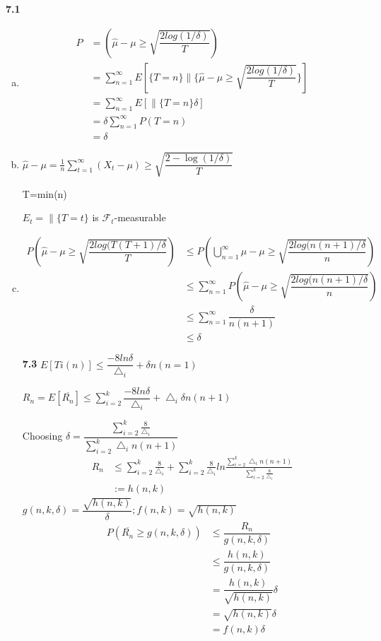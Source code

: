 



\noindent\textbf{7.1}

    \begin{enumerate}[(a)]
    \item
    \begin{align*}
    P &=(\hat{\mu}-\mu\ge\sqrt{\dfrac{2log(1/\delta)}{T}})\\
    &=\sum^{\infty}_{n=1}E[\{T=n\}\|\{\hat{\mu}-\mu\ge\sqrt{\dfrac{2log(1/\delta)}{T}}\}]\\
    &=\sum^{\infty}_{n=1}E[\|\{T=n\}\delta]\\
    &=\delta\sum^{\infty}_{n=1}P(T=n)\\
    &=\delta
    \end{align*}

    \item
    $\hat{\mu}-\mu=\frac{1}{n}\sum^{\infty}_{t=1}(X_t-\mu)\ge\sqrt{\dfrac{2-\log(1/\delta)}{T}}$

    T=min(n)

    $E_t=\|\{T=t\}$ is $\mathcal{F}_t$-measurable

    \item
    \begin{align*}
    P(\hat{\mu}-\mu\ge\sqrt{\dfrac{2log(T(T+1)/\delta}{T}}) &\le P(\bigcup^{\infty}_{n=1}\hat{\mu}-\mu\ge\sqrt{\dfrac{2log(n(n+1)/\delta}{n}})\\
    &\le \sum^{\infty}_{n=1}P(\hat{\mu}-\mu\ge\sqrt{\dfrac{2log(n(n+1)/\delta}{n}})\\
    &\le \sum^{\infty}_{n=1} \dfrac{\delta}{n(n+1)}\\
    &\le \delta
    \end{align*}








\noindent\textbf{7.3}
    $E[Ti(n)]\le\dfrac{-8ln\delta}{\bigtriangleup_i}+\delta n(n=1)$


    $R_n=E[\overline{R_n}]\le\sum^{k}_{i=2}\dfrac{-8ln\delta}{\bigtriangleup_i}+\bigtriangleup_i\delta n(n+1)$


    Choosing
    $\delta=\dfrac{\sum^{k}_{i=2}\frac{8}{\bigtriangleup_i}}{\sum^{k}_{i=2}\bigtriangleup_i   n(n+1)}$
    \begin{align*}
    R_n &\le\sum^{k}_{i=2}\frac{8}{\bigtriangleup_i}+\sum^{k}_{i=2}\frac{8}{\bigtriangleup_i}ln\frac{\sum^{k}_{i=2}\bigtriangleup_i n(n+1)}{\sum^{k}_{i=2}\frac{8}{\bigtriangleup_i}}\\
    &:=h(n,k)
    \end{align*}
    $g(n,k,\delta)=\dfrac{\sqrt{h(n,k)}}{\delta};f(n,k)=\sqrt{h(n,k)}$
    \begin{align*}
    P(\overline{R_n}\ge g(n,k,\delta)) &\le\dfrac{R_n}{g(n,k,\delta)}\\
    &\le\dfrac{h(n,k)}{g(n,k,\delta)}\\
    &=\dfrac{h(n,k)}{\sqrt{h(n,k)}}\delta\\
    &=\sqrt{h(n,k)}\delta\\
    &=f(n,k)\delta
    \end{align*}



\end{enumerate}
